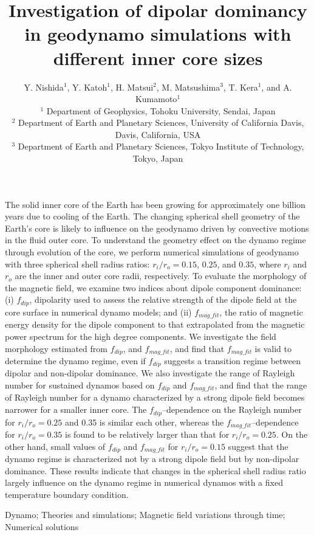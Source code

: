 \documentclass{gji}
\title[Dipolar dominancy in geodynamo with different inner core sizes]
{Investigation of dipolar dominancy in geodynamo simulations with different inner core sizes}
\author[Y. Nishida et al.]
{Y. Nishida$^1$, Y. Katoh$^1$, H. Matsui$^2$, M. Matsushima$^3$, T. Kera$^1$, and A. Kumamoto$^1$ \\
  $^1$ Department of Geophysics, Tohoku University, Sendai, Japan \\
  $^2$ Department of Earth and Planetary Sciences, University of California Davis, Davis, California, USA \\
  $^3$ Department of Earth and Planetary Sciences, Tokyo Institute of Technology, Tokyo, Japan
  }
\date{ }
\begin{document}
\maketitle
%
\begin{summary}
The solid inner core of the Earth has been growing for approximately one billion years due to cooling of the Earth. The changing spherical shell geometry of the Earth’s core is likely to influence on the geodynamo driven by convective motions in the fluid outer core. To understand the geometry effect on the dynamo regime through evolution of the core, we perform numerical simulations of geodynamo with three spherical shell radius ratios: $r_{i}/r_{o} = 0.15$, $0.25$, and $0.35$, where $r_{i}$ and $r_{o}$ are the inner and outer core radii, respectively. To evaluate the morphology of the magnetic field, we examine two indices about dipole component dominance: (i) $f_{dip}$, dipolarity used to assess the relative strength of the dipole field at the core surface in numerical dynamo models; and (ii) $f_{mag\_fit}$, the ratio of magnetic energy density for the dipole component to that extrapolated from the magnetic power spectrum for the high degree components. We investigate the field morphology estimated from $f_{dip}$, and $f_{mag\_fit}$, and find that $f_{mag\_fit}$ is valid to determine the dynamo regime, even if $f_{dip}$ suggests a transition regime between dipolar and non-dipolar dominance. We also investigate the range of Rayleigh number for sustained dynamos based on $f_{dip}$ and $f_{mag\_fit}$, and find that the range of Rayleigh number for a dynamo characterized by a strong dipole field becomes narrower for a smaller inner core. The $f_{dip}$–dependence on the Rayleigh number for $r_{i}/r_{o} = 0.25$ and 0.35 is similar each other, whereas the $f_{mag\_fit}$–dependence for $r_{i}/r_{o} = 0.35$ is found to be relatively larger than that for $r_{i}/r_{o} = 0.25$. On the other hand, small values of  $f_{dip}$ and  $f_{mag\_fit}$ for $r_{i}/r_{o} = 0.15$ suggest that the dynamo regime is characterized not by a strong dipole field but by non-dipolar dominance. These results indicate that changes in the spherical shell radius ratio largely influence on the dynamo regime in numerical dynamos with a fixed temperature boundary condition.
\end{summary}
%
\begin{keywords}
Dynamo; Theories and simulations; Magnetic field variations through time; Numerical solutions
\end{keywords}
%

%

%

%

%

%

%
\end{document}
